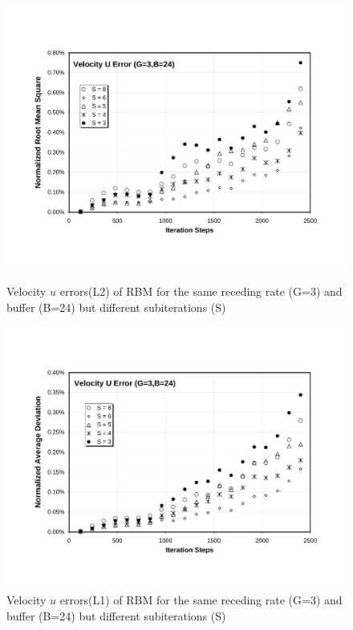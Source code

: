 \cp

\begin{figure}[htbp]
  \begin{center}
\includegraphics[scale=0.6]{../figures/Exp3-CASE1-dt0.005/G_3_B_24/G3-B24-U-NRMS.pdf}
    \caption{Velocity $u$ errors(L2) of RBM for the same receding rate (G=3) and buffer (B=24) but different subiterations (S)}
    \vspace{0.5in}
\includegraphics[scale=0.6]{../figures/Exp3-CASE1-dt0.005/G_3_B_24/G3-B24-U-NAD.pdf}
    \caption{Velocity $u$ errors(L1) of RBM for the same receding rate (G=3) and buffer (B=24) but different subiterations (S)}
  \end{center}
\end{figure}

